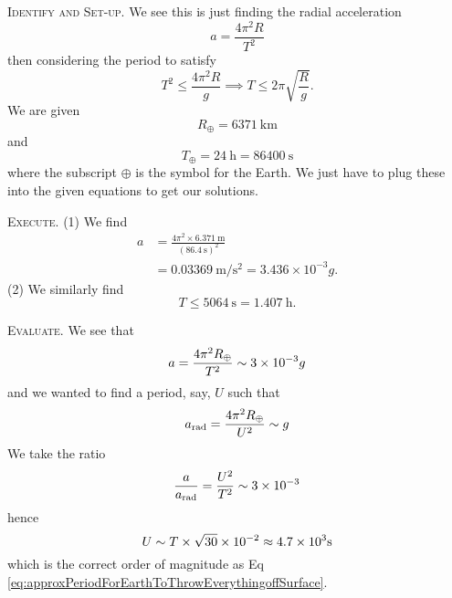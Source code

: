 \begin{soln}
\textsc{Identify and Set-up.}
We see this is just finding the radial acceleration
\begin{equation*}
a = \frac{4\pi^{2}R}{T^{2}}
\end{equation*}
then considering the period to satisfy
\begin{equation}
T^{2}\leq \frac{4\pi^{2}R}{g} \implies
T\leq2\pi\sqrt{\frac{R}{g}}.
\end{equation}
We are given
\begin{equation}
R_{\oplus} = \SI{6371}{\kilo\meter}
\end{equation}
and
\begin{equation}
T_{\oplus} = \SI{24}{\hour} = \SI{86400}{\second}
\end{equation}
where the subscript $\oplus$ is the symbol for the Earth. We just have
to plug these into the given equations to get our solutions.

\textsc{Execute.}
(1) We find 
\begin{equation}
\begin{split}
a &= \frac{4\pi^{2}\times\SI{6.371}{\meter}}{(\SI{86.4}{\second})^{2}}\\
&= \SI{0.03369}{\meter\per\second\squared} = 3.436\times10^{-3}g.
\end{split}
\end{equation}
(2) We similarly find
\begin{equation}\label{eq:approxPeriodForEarthToThrowEverythingoffSurface}
T\leq\SI{5064}{\second}=\SI{1.407}{\hour}.
\end{equation}

\textsc{Evaluate.} We see that
\begin{equation}
a=\frac{4\pi^{2}R_{\oplus}}{T^{2}}\sim3\times10^{-3}g
\end{equation}
and we wanted to find a period, say, $U$ such that
\begin{equation}
a_{\text{rad}} = \frac{4\pi^{2}R_{\oplus}}{U^{2}}\sim g
\end{equation}
We take the ratio
\begin{equation}
\frac{a}{a_{\text{rad}}}=\frac{U^{2}}{T^{2}}\sim3\times10^{-3}
\end{equation}
hence
\begin{equation}
U\sim T\times\sqrt{30}\times10^{-2} \approx 4.7\times10^{3}\si{\second}
\end{equation}
which is the correct order of magnitude as Eq \eqref{eq:approxPeriodForEarthToThrowEverythingoffSurface}.
\end{soln}


